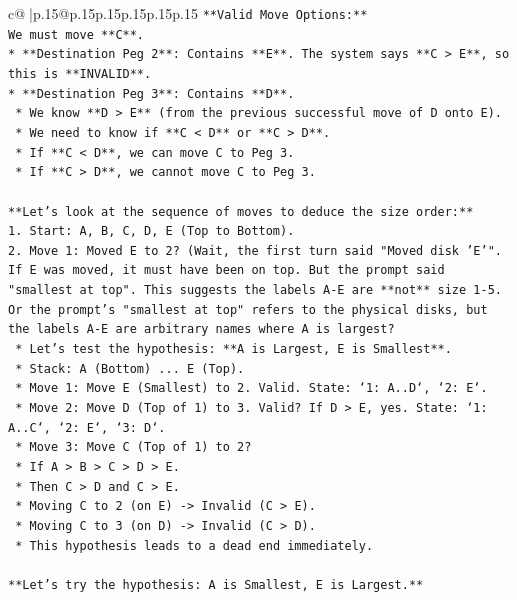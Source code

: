 \documentclass{article}
\begin{document}
{\begin{supertabular}{c@{$\;$}|p{.15\linewidth}@{}p{.15\linewidth}p{.15\linewidth}p{.15\linewidth}p{.15\linewidth}p{.15\linewidth}}
{{{\texttt{**Valid Move Options:**} \\
\texttt{We must move **C**.} \\
\texttt{*   **Destination Peg 2**: Contains **E**. The system says **C > E**, so this is **INVALID**.} \\
\texttt{*   **Destination Peg 3**: Contains **D**.} \\
\texttt{    *   We know **D > E** (from the previous successful move of D onto E).} \\
\texttt{    *   We need to know if **C < D** or **C > D**.} \\
\texttt{    *   If **C < D**, we can move C to Peg 3.} \\
\texttt{    *   If **C > D**, we cannot move C to Peg 3.} \\
\\ 
\texttt{**Let's look at the sequence of moves to deduce the size order:**} \\
\texttt{1.  Start: A, B, C, D, E (Top to Bottom).} \\
\texttt{2.  Move 1: Moved E to 2? (Wait, the first turn said "Moved disk 'E'". If E was moved, it must have been on top. But the prompt said "smallest at top". This suggests the labels A{-}E are **not** size 1{-}5. Or the prompt's "smallest at top" refers to the physical disks, but the labels A{-}E are arbitrary names where A is largest?} \\
\texttt{    *   Let's test the hypothesis: **A is Largest, E is Smallest**.} \\
\texttt{    *   Stack: A (Bottom) ... E (Top).} \\
\texttt{    *   Move 1: Move E (Smallest) to 2. Valid. State: `1: A..D`, `2: E`.} \\
\texttt{    *   Move 2: Move D (Top of 1) to 3. Valid? If D > E, yes. State: `1: A..C`, `2: E`, `3: D`.} \\
\texttt{    *   Move 3: Move C (Top of 1) to 2?} \\
\texttt{        *   If A > B > C > D > E.} \\
\texttt{        *   Then C > D and C > E.} \\
\texttt{        *   Moving C to 2 (on E) {-}> Invalid (C > E).} \\
\texttt{        *   Moving C to 3 (on D) {-}> Invalid (C > D).} \\
\texttt{    *   This hypothesis leads to a dead end immediately.} \\
\\ 
\texttt{**Let's try the hypothesis: A is Smallest, E is Largest.**} \\
}}}
\end{supertabular}}
\end{document}
